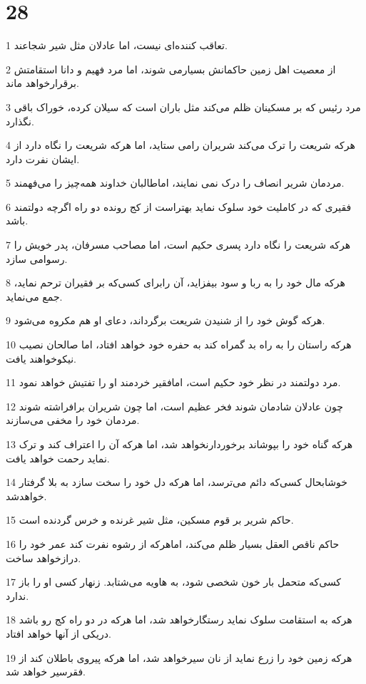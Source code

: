 \chapter{28}

\par 1 تعاقب کننده‌ای نیست، اما عادلان مثل شیر شجاعند.
\par 2 از معصیت اهل زمین حاکمانش بسیارمی شوند، اما مرد فهیم و دانا استقامتش برقرارخواهد ماند.
\par 3 مرد رئیس که بر مسکینان ظلم می‌کند مثل باران است که سیلان کرده، خوراک باقی نگذارد.
\par 4 هر‌که شریعت را ترک می‌کند شریران رامی ستاید، اما هر‌که شریعت را نگاه دارد از ایشان نفرت دارد.
\par 5 مردمان شریر انصاف را درک نمی نمایند، اماطالبان خداوند همه‌چیز را می‌فهمند.
\par 6 فقیری که در کاملیت خود سلوک نماید بهتراست از کج رونده دو راه اگر‌چه دولتمند باشد.
\par 7 هر‌که شریعت را نگاه دارد پسری حکیم است، اما مصاحب مسرفان، پدر خویش را رسوامی سازد.
\par 8 هر‌که مال خود را به ربا و سود بیفزاید، آن رابرای کسی‌که بر فقیران ترحم نماید، جمع می‌نماید.
\par 9 هر‌که گوش خود را از شنیدن شریعت برگرداند، دعای او هم مکروه می‌شود.
\par 10 هر‌که راستان را به راه بد گمراه کند به حفره خود خواهد افتاد، اما صالحان نصیب نیکوخواهند یافت.
\par 11 مرد دولتمند در نظر خود حکیم است، امافقیر خردمند او را تفتیش خواهد نمود.
\par 12 چون عادلان شادمان شوند فخر عظیم است، اما چون شریران برافراشته شوند مردمان خود را مخفی می‌سازند.
\par 13 هر‌که گناه خود را بپوشاند برخوردارنخواهد شد، اما هر‌که آن را اعتراف کند و ترک نماید رحمت خواهد یافت.
\par 14 خوشابحال کسی‌که دائم می‌ترسد، اما هرکه دل خود را سخت سازد به بلا گرفتار خواهدشد.
\par 15 حاکم شریر بر قوم مسکین، مثل شیر غرنده و خرس گردنده است.
\par 16 حاکم ناقص العقل بسیار ظلم می‌کند، اماهر‌که از رشوه نفرت کند عمر خود را درازخواهد ساخت.
\par 17 کسی‌که متحمل بار خون شخصی شود، به هاویه می‌شتابد. زنهار کسی او را باز ندارد.
\par 18 هر‌که به استقامت سلوک نماید رستگارخواهد شد، اما هر‌که در دو راه کج رو باشد دریکی از آنها خواهد افتاد.
\par 19 هر‌که زمین خود را زرع نماید از نان سیرخواهد شد، اما هر‌که پیروی باطلان کند از فقرسیر خواهد شد.
